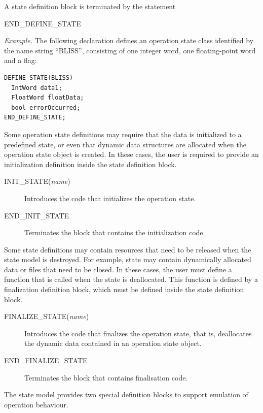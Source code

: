 \documentclass[twoside]{tceusermanual}
\begin{document}
A state definition block is terminated by the statement
\begin{description}
\item[END\_DEFINE\_STATE]
\end{description}

\emph{Example.} The following declaration defines an operation state class
identified by the name string ``BLISS'', consisting of one integer word, one
floating-point word and a flag:
\begin{verbatim}
DEFINE_STATE(BLISS) 
  IntWord data1;
  FloatWord floatData;
  bool errorOccurred;
END_DEFINE_STATE;
\end{verbatim}


Some operation state definitions may require that the data is initialized to
a predefined state, or even that dynamic data structures are allocated when
the operation state object is created. In these cases, the user is required
to provide an initialization definition inside the state definition block.
\begin{description}
\item[INIT\_STATE(\emph{name})]%
  Introduces the code that initializes the operation state.
\item[END\_INIT\_STATE]%
  Terminates the block that contains the initialization code.
\end{description}

Some state definitions may contain resources that need to be released when the
state model is destroyed. For example, state may contain dynamically
allocated data or files that need to be closed. In these cases, the user
must define a function that is called when the state is deallocated. This
function is defined by a finalization definition block, which must be
defined inside the state definition block.
\begin{description}
\item[FINALIZE\_STATE(\emph{name})]%
  Introduces the code that finalizes the operation state, that is,
  deallocates the dynamic data contained in an operation state object.
\item[END\_FINALIZE\_STATE]%
  Terminates the block that contains finalisation code.
\end{description}

The state model provides two special definition blocks to support emulation
of operation behaviour.
\end{document}
